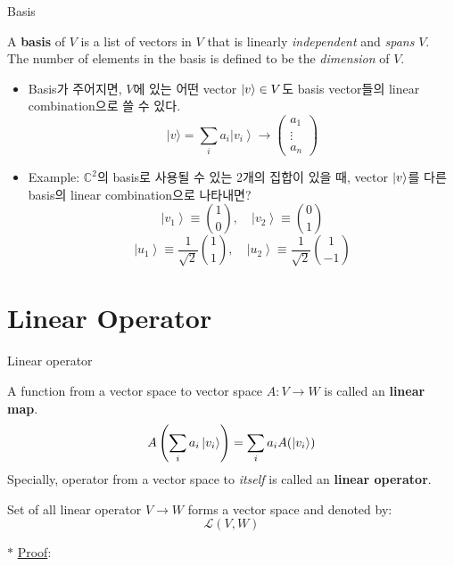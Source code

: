 \documentclass[9pt]{beamer}
\begin{document}
    \begin{frame}{Basis}
        \begin{definition}[basis]
            A \textbf {basis} of $V$ is a list of vectors in $V$ that is linearly \textit{independent} and \textit{spans} $V$. \\
            The number of elements in the basis is defined to be the \textit{dimension} of $V$.
        \end{definition}
        \begin{itemize}
            \item Basis가 주어지면, $V$에 있는 어떤 vector $\ket v \in V$도 basis vector들의 linear combination으로 쓸 수 있다.
            $$ |v\rangle=\sum_i a_i\left|v_i\right\rangle \rightarrow\left(\begin{array}{c} a_1 \\ \vdots \\ a_n \end{array}\right) $$
            \item Example:
            $\mathbb C^2$의 basis로 사용될 수 있는 2개의 집합이 있을 때, vector $\ket v$를 다른 basis의 linear combination으로 나타내면?
            $$ \left|v_1\right\rangle \equiv\binom{1}{0}, \quad\left|v_2\right\rangle \equiv\binom{0}{1} $$
            $$ \left|u_1\right\rangle \equiv \frac{1}{\sqrt{2}}\binom{1}{1}, \quad\left|u_2\right\rangle \equiv \frac{1}{\sqrt{2}}\binom{1}{-1} $$
        \end{itemize}
    \end{frame}


    \section{Linear Operator}
    \begin{frame}{Linear operator}
        \begin{definition}
            A function from a vector space to vector space $A: V \rightarrow W$ is called an \textbf{linear map}.
            $$A \left( \sum_i a_i \ket{v_i} \right) = \sum_i a_i A(\ket{v_i})$$
            Specially, operator from a vector space to \textit{itself} is called an \textbf{linear operator}.
        \end{definition}

        \begin{theorem}
            Set of all linear operator $V \rightarrow W$ forms a vector space and denoted by: 
            $$\mathcal L(V, W)$$
        \end{theorem}
        $\ast$ \underline{Proof}:
        \vspace{2cm}
    \end{frame}
    
\end{document}
